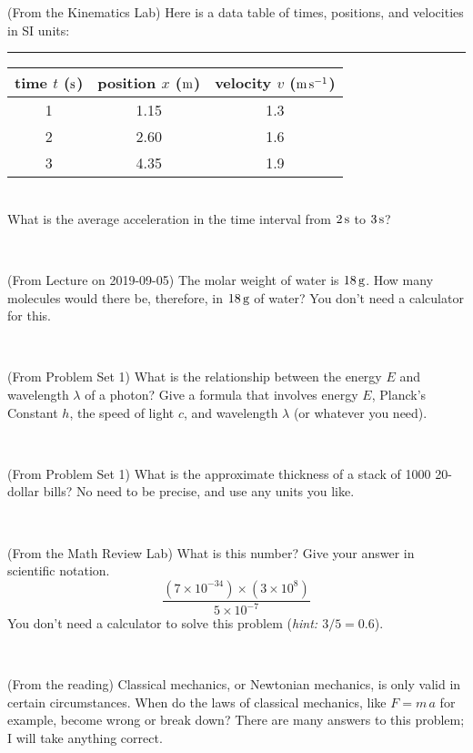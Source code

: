 \documentclass[12pt, letterpaper]{article}
\begin{document}
\begin{problem} (From the Kinematics Lab)
Here is a data table of times, positions, and velocities in SI units:\\
\rule{1.0in}{0pt}\begin{tabular}{c|c|c}
time $t$ ($\mathrm{s}$) & position $x$ ($\mathrm{m}$) & velocity $v$ ($\mathrm{m}\,\mathrm{s}^{-1}$) \\
\hline
1 & 1.15 & 1.3 \\
2 & 2.60 & 1.6 \\
3 & 4.35 & 1.9 \\
\hline
\end{tabular}\\
What is the average acceleration in the time interval from $2\,\mathrm{s}$ to $3\,\mathrm{s}$?
\end{problem}


\vfill ~

\begin{problem} (From Lecture on 2019-09-05)
The molar weight of water is $18\,\mathrm{g}$. How many molecules would there
be, therefore, in $18\,\mathrm{g}$ of water? You don't need a calculator for
this.
\end{problem}


\vfill ~

\begin{problem} (From Problem Set 1)
What is the relationship between the energy $E$ and wavelength
$\lambda$ of a photon? Give a formula that involves energy $E$,
Planck's Constant $h$, the speed of light $c$, and wavelength
$\lambda$ (or whatever you need).
\end{problem}

\vfill ~

\begin{problem} (From Problem Set 1)
What is the approximate thickness of a stack of 1000 20-dollar bills?
No need to be precise, and use any units you like.
\end{problem}


\vfill ~


\clearpage


\begin{problem} (From the Math Review Lab)
What is this number? Give your answer in scientific notation.
$$
\frac{(7\times10^{-34})\times(3\times10^8)}{5\times10^{-7}}
$$
You don't need a calculator to solve this problem (\textit{hint: $3/5=0.6$}).
\end{problem}


\vfill ~

\begin{problem} (From the reading)
Classical mechanics, or Newtonian mechanics, is only valid in certain
circumstances. When do the laws of classical mechanics, like $F =
m\,a$ for example, become wrong or break down? There are many answers
to this problem; I will take anything correct.
\end{problem}
\end{document}

